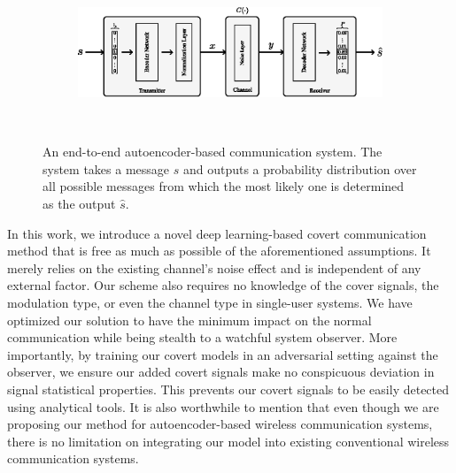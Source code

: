 \begin{figure}[tp!]
	\center
	\begin{subfigure}{0.45\textwidth}
		\includegraphics[width=\linewidth]{figs/original_autoencoder_architecture.eps}
	\end{subfigure}
	\\
	\caption{An end-to-end autoencoder-based communication system. The system takes a message \(s\) and outputs a probability distribution over all possible messages from which the most likely one is determined as the output \(\hat{s}\).}	
	\label{fig:original_autoencoder_architecture}
\end{figure}


In this work, we introduce a novel deep learning-based covert communication method that is free as much as possible of the aforementioned assumptions. It merely relies on the existing channel's noise effect and is independent of any external factor. Our scheme also requires no knowledge of the cover signals, the modulation type, or even the channel type in single-user systems. We have optimized our solution to have the minimum impact on the normal communication while being stealth to a watchful system observer. More importantly, by training our covert models in an adversarial setting against the observer, we ensure our added covert signals make no conspicuous deviation in signal statistical properties. This prevents our covert signals to be easily detected using analytical tools. It is also worthwhile to mention that even though we are proposing our method for autoencoder-based wireless communication systems, there is no limitation on integrating our model into existing conventional wireless communication systems.



